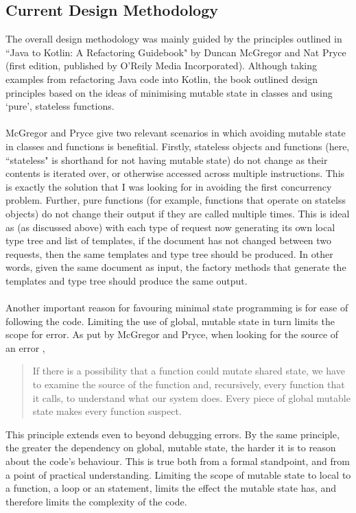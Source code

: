 \documentclass[../main.tex]{subfiles}
\begin{document}
\subsection{Current Design Methodology}
The overall design methodology was mainly guided by the principles outlined in ``Java to Kotlin: A Refactoring Guidebook" by Duncan McGregor and Nat Pryce (first edition, published by O'Reily Media Incorporated). Although taking examples from refactoring Java code into Kotlin, the book outlined design principles based on the ideas of minimising mutable state in classes and using `pure', stateless functions. 
\\
\\
McGregor and Pryce give two relevant scenarios in which avoiding mutable state in classes and functions is benefitial. Firstly, stateless objects and functions (here, ``stateless" is shorthand for not having mutable state) do not change as their contents is iterated over, or otherwise accessed across multiple instructions. \cite{java_to_kotlin_stateless} This is exactly the solution that I was looking for in avoiding the first concurrency problem. Further, pure functions (for example, functions that operate on statelss objects) do not change their output if they are called multiple times\cite{java_to_kotlin_pure_functions}. This is ideal as (as discussed above) with each type of request now generating its own local type tree and list of templates, if the document has not changed between two requests, then the same templates and type tree should be produced. In other words, given the same document as input, the factory methods that generate the templates and type tree should produce the same output.
\\
\\
Another important reason for favouring minimal state programming is for ease of following the code. Limiting the use of global, mutable state in turn limits the scope for error. As put by McGregor and Pryce, when looking for the source of an error \cite{java_to_kotlin_error}, 
\begin{quote}
    If there is a possibility that a function could mutate shared state, we have to examine the source of the function and, recursively, every function that it calls, to understand what our system does. Every piece of global mutable state makes every function suspect.
\end{quote}
This principle extends even to beyond debugging errors. By the same principle, the greater the dependency on global, mutable state, the harder it is to reason about the code's behaviour. This is true both from a formal standpoint, and from a point of practical understanding. Limiting the scope of mutable state to local to a function, a  loop or an  statement, limits the effect the mutable state has, and therefore limits the complexity of the code.
\end{document}
